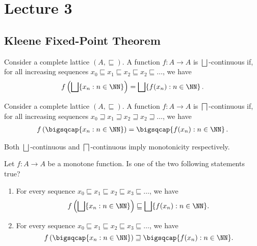 \section{Lecture 3}
\subsection{Kleene Fixed-Point Theorem}
\begin{definition}
    Consider a complete lattice $(A, \sqsubseteq)$.
	A function $f \colon A \to A$ is $\bigsqcup$-continuous if, for all increasing sequences $x_0 \sqsubseteq x_1 \sqsubseteq x_2 \sqsubseteq x_2 \sqsubseteq \ldots$, we have
    \begin{align*}
        f \left( \bigsqcup \{ x_n : n \in \NN \} \right) = \bigsqcup \{ f(x_n) : n \in \NN \} \,.
    \end{align*}
\end{definition}


\begin{definition}
    Consider a complete lattice $(A, \sqsubseteq)$.
	A function $f \colon A \to A$ is $\bigsqcap$-continuous if, for all increasing sequences $x_0 \sqsupseteq x_1 \sqsupseteq x_2 \sqsupseteq x_2 \sqsupseteq \ldots$, we have
 \begin{align*}
     	f \left( \bigsqcap \{ x_n : n \in \NN \} \right) = \bigsqcap \{ f(x_n) : n \in \NN \} \,.
 \end{align*}
\end{definition}

\begin{lemma}
    Both $\bigsqcup$-continuous and $\bigsqcap$-continuous imply monotonicity respectively. 
\end{lemma}


\begin{exercise}
    Let $f \colon A \to A$ be a monotone function. Is one of the two following statements true?
    \begin{enumerate}
        \item For every sequence $x_0 \sqsubseteq x_1 \sqsubseteq x_2 \sqsubseteq x_3 \sqsubseteq \ldots$, we have
        \[
        f \left( \bigsqcup \{ x_n : n \in \NN \} \right) \sqsubseteq \bigsqcup \{ f(x_n) : n \in \NN \}.
        \]

        \item For every sequence $x_0 \sqsubseteq x_1 \sqsubseteq x_2 \sqsubseteq x_3 \sqsubseteq \ldots$, we have
        \[
        f \left( \bigsqcap \{ x_n : n \in \NN \} \right) \sqsupseteq \bigsqcap \{ f(x_n) : n \in \NN \}.
        \]
    \end{enumerate}
\end{exercise}



